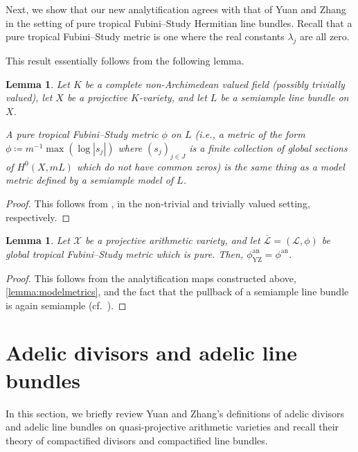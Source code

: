 \documentclass[11pt,reqno]{amsart}
\newcommand{\cX}{\mathcal{X}}
\newcommand{\cL}{\mathcal{L}}
\theoremstyle{theorem}
\numberwithin{equation}{subsection}
\newtheorem{lemma}[subsubsection]{Lemma}
\numberwithin{equation}{subsection}
\theoremstyle{definition}
\theoremstyle{remark}
\numberwithin{equation}{subsubsection} \numberwithin{figure}{section}
\DeclareMathOperator{\an}{an}
\DeclareMathOperator{\YZ}{YZ}
\begin{document}
Next, we show that our new analytification agrees with that of Yuan and Zhang in the setting of pure tropical Fubini--Study Hermitian line bundles. 
Recall that a pure tropical Fubini--Study metric is one where the real constants $\lambda_{j}$ are all zero. 

This result essentially follows from the following lemma. 

\begin{lemma}\label{lemma:modelmetrics}
Let $K$ be a complete non-Archimedean valued field (possibly trivially valued), let $X$ be a projective $K$-variety, and let $L$ be a semiample line bundle on $X$. 


A pure tropical Fubini--Study metric $\phi$ on $L$ (i.e., a metric of the form $\phi \coloneqq m^{-1}\max (\log |s_{j}|)$ where $(s_{j})_{j\in J}$ is a finite collection of global sections of $H^0(X,mL)$ which do not have common zeros) is the same thing as a model metric defined by a semiample model of $L$. 
\end{lemma}

\begin{proof}
This follows from \cite[Proposition 2.13.(ii) \& Lemma 2.14]{BoucksomJonsson:SingularPSH}, in the non-trivial and trivially valued setting, respectively. 
\end{proof}

\begin{lemma}
Let $\cX$ be a projective arithmetic variety, and let $\overline{\cL} = (\cL,\phi)$ be global tropical Fubini--Study metric which is pure. 
Then, $\phi^{\an}_{\YZ} = \phi^{\an}$. 
\end{lemma}

\begin{proof}
This follows from the analytification maps constructed above, \autoref{lemma:modelmetrics}, and the fact that the pullback of a semiample line bundle is again semiample (cf.~\cite[Proposition 1.2]{Fujita:Semipositive}). 
\end{proof}

\section{Adelic divisors and adelic line bundles}
\label{sec:adelicdivisorsandlinebundles}
In this section, we briefly review Yuan and Zhang's definitions of adelic divisors and adelic line bundles on quasi-projective arithmetic varieties and recall their theory of compactified divisors and compactified line bundles. 
\end{document}
